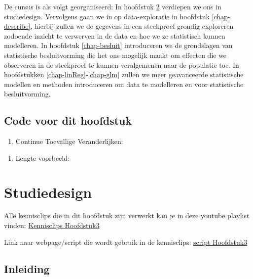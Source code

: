 \documentclass[
  12pt,dutch,coursenotes]{book}
\providecommand{\tightlist}{%
  \setlength{\itemsep}{0pt}\setlength{\parskip}{0pt}}
\begin{document}
De cursus is als volgt georganiseerd:
In hoofdstuk \ref{chap-design} verdiepen we ons in studiedesign. Vervolgens gaan we in op data-exploratie in hoofdstuk \ref{chap-describe}, hierbij zullen we de gegevens in een steekproef grondig exploreren zodoende inzicht te verwerven in de data en hoe we ze statistisch kunnen modelleren.
In hoofdstuk \ref{chap-besluit} introduceren we de grondslagen van statistische besluitvorming die het ons mogelijk maakt om effecten die we observeren in de steekproef te kunnen veralgemenen naar de populatie toe.
In hoofdstukken \ref{chap-linReg}-\ref{chap-glm} zullen we meer geavanceerde statistische modellen en methoden introduceren om data te modelleren en voor statistische besluitvorming.

\hypertarget{code-voor-dit-hoofdstuk}{%
\section{Code voor dit hoofdstuk}\label{code-voor-dit-hoofdstuk}}

\begin{enumerate}
\def\labelenumi{\arabic{enumi}.}
\tightlist
\item
  Continue Toevallige Veranderlijken:
\end{enumerate}

\begin{enumerate}
\def\labelenumi{\arabic{enumi}.}
\setcounter{enumi}{1}
\tightlist
\item
  Lengte voorbeeld:
\end{enumerate}

\hypertarget{chap-design}{%
\chapter{Studiedesign}\label{chap-design}}

Alle kennisclips die in dit hoofdstuk zijn verwerkt kan je in deze youtube playlist vinden: \href{https://www.youtube.com/playlist?list=PLZH1hP8_LbJL1GjhnpEDlx78OJ6qUzSix}{Kennisclips Hoofdstuk3}

Link naar webpage/script die wordt gebruik in de kennisclips: \href{https://statomics.github.io/sbc21/rmd/03-experimentalDesign.html}{script Hoofdstuk3}

\hypertarget{inleiding-2}{%
\section{Inleiding}\label{inleiding-2}}
\end{document}
